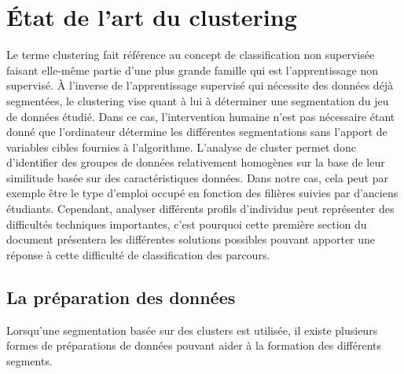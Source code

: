 \documentclass[memoire.tex]{subfiles}
\begin{document}
\chapter{État de l'art du clustering}
Le terme clustering fait référence au concept de classification non supervisée faisant elle-même partie d'une plus grande famille qui est l'apprentissage non supervisé. À l'inverse de l'apprentissage supervisé qui nécessite des données déjà segmentées, le clustering vise quant à lui à déterminer une segmentation du jeu de données étudié. Dans ce cas, l'intervention humaine n'est pas nécessaire étant donné  que l'ordinateur détermine les différentes segmentations sans l'apport de variables cibles fournies à l'algorithme.
L'analyse de cluster permet donc d'identifier des groupes de données relativement homogènes sur la base de leur similitude basée sur des caractéristiques données. Dans notre cas, cela peut par exemple être le type d'emploi occupé en fonction des filières suivies par d'anciens étudiants. Cependant, analyser différents profils d'individus peut représenter des difficultés techniques importantes, c'est pourquoi cette première section du document présentera les différentes solutions possibles pouvant apporter une réponse à cette difficulté de classification des parcours.
\section{La préparation des données}
Lorsqu'une segmentation basée sur des clusters est utilisée, il existe plusieurs formes de préparations de données pouvant aider à la formation des différents segments. 
\end{document}
